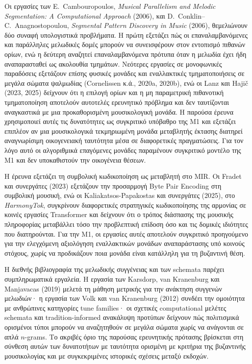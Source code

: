 \documentclass[11pt,a4paper]{article}
\begin{document}
Οι εργασίες των E.~Cambouropoulos, \emph{Musical Parallelism and Melodic Segmentation: A Computational Approach} (2006), και D.~Conklin--C.~Anagnostopoulou, \emph{Segmental Pattern Discovery in Music} (2006), θεμελιώνουν δύο συναφή υπολογιστικά προβλήματα. Η πρώτη εξετάζει πώς οι επαναλαμβανόμενες και παράλληλες μελωδικές δομές μπορούν να συνεισφέρουν στον εντοπισμό πιθανών ορίων, ενώ η δεύτερη αναζητεί επαναλαμβανόμενα πρότυπα όταν η μελωδία έχει ήδη αναπαρασταθεί ως ακολουθία τμημάτων. Νεότερες εργασίες σε μονοφωνικές παραδόσεις εξετάζουν επίσης φυσικές μονάδες και εναλλακτικές τμηματοποιήσεις σε μεγάλα σώματα ψαλμωδίας (Cornelissen κ.ά., 2020a, 2020b), ενώ οι Lanz και Hajič (2023, 2025) δείχνουν ότι η επιλογή ορίων και η μη παραμετρική πιθανοτική τμηματοποίηση αποτελούν αυτοτελές ερευνητικό πρόβλημα και δεν ταυτίζονται αναγκαστικά με μια προκαθορισμένη μουσικολογική μονάδα. Η παρούσα έρευνα χρησιμοποιεί αυτές τις δυνατότητες ως συγκριτικό υπόβαθρο της M1 και εξετάζει επιπλέον αν μια μουσικολογικά τεκμηριωμένη μονάδα μεταβλητής έκτασης διατηρεί αναγνωρίσιμη οικογενειακή ταυτότητα μέσα σε διαφορετικές πραγματώσεις. Για τον λόγο αυτό οι αλγοριθμικά επαγόμενες μονάδες παραμένουν συγκριτικό μοντέλο της M1 και δεν υποκαθιστούν την οικογένεια θέσεων.

Η έρευνα εξετάζει τη συμβολική κωδικοποίηση ως μεταβλητή στο MIR. Οι Fradet και συνεργάτες (2023) εξετάζουν την προσαρμογή Byte Pair Encoding στη συμβολική μουσική, ενώ οι Kaliakatsos-Papakostas και συνεργάτες (2025), στο \emph{HarmonyTok}, συγκρίνουν διαφορετικές στρατηγικές κωδικοποίησης της αρμονίας σε κοινές εργασίες Transformer και δείχνουν ότι ο τρόπος διάσπασης της μουσικής πληροφορίας μεταβάλλει τόσο την προβλεπτική επίδοση όσο και τις δομικές ιδιότητες που διατηρούνται. Για την M1, οι εργασίες αυτές αποτελούν συγκριτικό προηγούμενο για την ελεγχόμενη αξιολόγηση εναλλακτικών μονάδων αναπαράστασης υπό κοινούς στόχους, χωρίς να προδικάζουν ποια μονάδα είναι κατάλληλη για τη βυζαντινή θέση.

Η διεθνής βιβλιογραφία της μελωδικής συγγένειας και των schemata παρέχει συμπληρωματικά εργαλεία. Η εργασία των Karsdorp, van Kranenburg και Manjavacas (2019) μελετά τη μάθηση μετρικής για την ανάκτηση συγγενών μελωδιών· η εργασία των Volk και van Kranenburg (2012) συνδέει την ομοιότητα με ανθρώπινες κατηγορίες tune families· οι σχετικές computational μελέτες schemata και tradition-informed ανακάλυψη προτύπων δείχνουν πώς πολιτισμικά ορισμένοι τύποι μπορούν να αναζητηθούν σε μεγάλα σώματα χωρίς να ανάγονται σε απλά $n$-grams. Το ακριβές όριο της παρούσας ερευνητικής πρότασης βρίσκεται στη σύνθεση αυτών των δυνατοτήτων με ταυτότητα ορισμένη με κριτήρια της βυζαντινής μουσικολογίας και με συγκεκριμένες ιστορικές σχέσεις μεταξύ εκδοχών.
\end{document}

